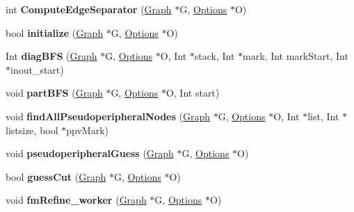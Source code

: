 \begin{DoxyCompactItemize}
\item 
\hypertarget{namespace_mongoose_ad8595d581461c57e6da403a3fc7a0604}{}\label{namespace_mongoose_ad8595d581461c57e6da403a3fc7a0604} 
int {\bfseries Compute\+Edge\+Separator} (\hyperlink{class_mongoose_1_1_graph}{Graph} $\ast$G, \hyperlink{struct_mongoose_1_1_options}{Options} $\ast$O)
\item 
\hypertarget{namespace_mongoose_a29db101ebccc8a6570f6d9457afd6629}{}\label{namespace_mongoose_a29db101ebccc8a6570f6d9457afd6629} 
bool {\bfseries initialize} (\hyperlink{class_mongoose_1_1_graph}{Graph} $\ast$G, \hyperlink{struct_mongoose_1_1_options}{Options} $\ast$O)
\item 
\hypertarget{namespace_mongoose_af97548a965b44daddc8e1e517963796d}{}\label{namespace_mongoose_af97548a965b44daddc8e1e517963796d} 
Int {\bfseries diag\+B\+FS} (\hyperlink{class_mongoose_1_1_graph}{Graph} $\ast$G, \hyperlink{struct_mongoose_1_1_options}{Options} $\ast$O, Int $\ast$stack, Int $\ast$mark, Int mark\+Start, Int $\ast$inout\+\_\+start)
\item 
\hypertarget{namespace_mongoose_a3eadbf0bc0b05932eb3543c361bd7496}{}\label{namespace_mongoose_a3eadbf0bc0b05932eb3543c361bd7496} 
void {\bfseries part\+B\+FS} (\hyperlink{class_mongoose_1_1_graph}{Graph} $\ast$G, \hyperlink{struct_mongoose_1_1_options}{Options} $\ast$O, Int start)
\item 
\hypertarget{namespace_mongoose_adea23a128e557385a7ca6c5e09bd9d1d}{}\label{namespace_mongoose_adea23a128e557385a7ca6c5e09bd9d1d} 
void {\bfseries find\+All\+Pseudoperipheral\+Nodes} (\hyperlink{class_mongoose_1_1_graph}{Graph} $\ast$G, \hyperlink{struct_mongoose_1_1_options}{Options} $\ast$O, Int $\ast$list, Int $\ast$listsize, bool $\ast$ppv\+Mark)
\item 
\hypertarget{namespace_mongoose_a5e3abdf9337ae48b66942a62e6ec981d}{}\label{namespace_mongoose_a5e3abdf9337ae48b66942a62e6ec981d} 
void {\bfseries pseudoperipheral\+Guess} (\hyperlink{class_mongoose_1_1_graph}{Graph} $\ast$G, \hyperlink{struct_mongoose_1_1_options}{Options} $\ast$O)
\item 
\hypertarget{namespace_mongoose_a8a62b5b07991028afb8af0b82b39f66e}{}\label{namespace_mongoose_a8a62b5b07991028afb8af0b82b39f66e} 
bool {\bfseries guess\+Cut} (\hyperlink{class_mongoose_1_1_graph}{Graph} $\ast$G, \hyperlink{struct_mongoose_1_1_options}{Options} $\ast$O)
\item 
\hypertarget{namespace_mongoose_aeb464d0e63dccc884cd7c263be5075ee}{}\label{namespace_mongoose_aeb464d0e63dccc884cd7c263be5075ee} 
void {\bfseries fm\+Refine\+\_\+worker} (\hyperlink{class_mongoose_1_1_graph}{Graph} $\ast$G, \hyperlink{struct_mongoose_1_1_options}{Options} $\ast$O)

\end{DoxyCompactItemize}
